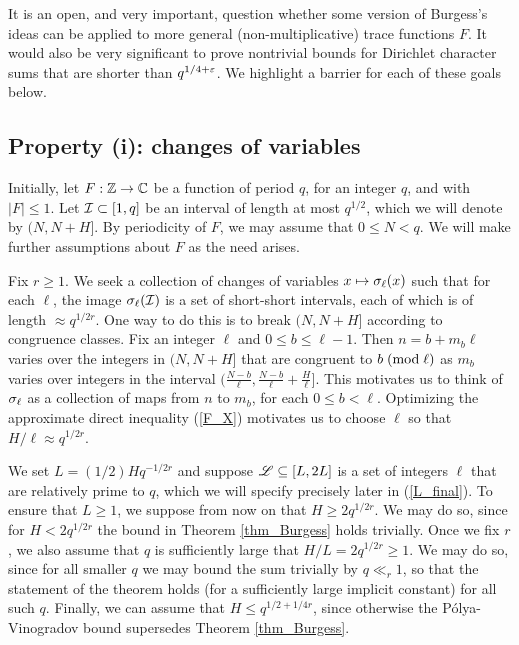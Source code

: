 \documentclass[oneside,11pt]{amsart}
\begin{document}
 
 It is  an open, and very important, question whether some version of Burgess's ideas can be applied to more general (non-multiplicative) trace functions $F$.
 It would also be very significant to prove nontrivial bounds for  Dirichlet character sums that are shorter than $q^{1/4+ \varepsilon}$.
We highlight a barrier for each of these goals below.






 

\subsection{Property (i): changes of variables}
 Initially, let $F: \mathbb{Z} \rightarrow \mathbb{C}$ be a function of period $q$, for an integer $q$, and with $|F| \leq 1$. Let $\mathcal{I} \subset [1,q]$ be an interval of length at most $q^{1/2}$, which we will denote by $(N,N+H]$. By periodicity of $F$, we may assume that $0 \leq N < q$.
We will make further assumptions about $F$ as the need arises.

Fix $r \geq 1$. We seek a collection of changes of variables $x \mapsto \sigma_\ell(x)$ such that for each $\ell$, the image $\sigma_\ell(\mathcal{I})$ is a set of short-short intervals, each of which is of length $\approx q^{1/2r}$.  
One way to do this is to break $(N,N+H]$ according to congruence classes.
Fix an integer $\ell$ and   $0 \leq b \leq \ell-1$. Then $n=b+m_b \ell$ varies over the integers in $(N,N+H]$ that are congruent to $b \; ( \text{mod} \; \ell)$ as $m_b$ varies over integers in the interval $(\frac{N-b}{\ell}, \frac{N-b}{\ell} + \frac{H}{\ell}]$. 
This motivates us to think of  $\sigma_\ell$ as a collection of maps from $n$ to $m_b$, for each $0 \leq b < \ell$. 
Optimizing the approximate direct inequality (\ref{F_X}) motivates us to choose  $\ell$ so that $H/\ell \approx q^{1/2r}$.


We set $L=(1/2)Hq^{-1/2r}$ and suppose
$
 \mathscr{L} \subseteq [L,2L] 
$
 is a set of   integers $\ell$  that are relatively prime to $q$, which we will specify precisely  later in (\ref{L_final}).
 To ensure that $L\geq 1$, we suppose from now on that $H \geq 2q^{1/2r}$. We may do so, since for $H < 2q^{1/2r}$ the bound in Theorem \ref{thm_Burgess} holds trivially.  
Once we fix $r$, we also assume that $q$ is sufficiently large that $H/L=2q^{1/2r} \geq 1$. 
We may do so, since for all smaller $q$ we may bound the sum trivially by $q \ll_r 1$, so that the statement of the theorem holds (for a sufficiently large implicit constant) for all such $q$. Finally, we can assume that $H \leq q^{1/2+1/4r}$, since otherwise the P\'olya-Vinogradov bound supersedes Theorem \ref{thm_Burgess}. 
\end{document}
